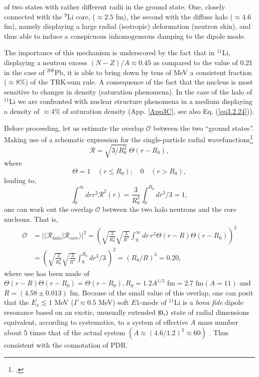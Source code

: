 of two states with rather different radii in the ground state. One, closely connected with the $^{9}$Li core, ($\approx 2.5$ fm), the second with the diffuse halo ($\approx 4.6$ fm), namely displaying a large radial (isotropic) deformation (neutron skin), and thus able to induce a conspicuous inhomogeneous damping to the dipole mode. 


The importance of this mechanism is underscored by the fact that in $^{11}$Li, displaying a neutron excess $(N-Z)/A\approx0.45$ as compared to the value of 0.21 in the case of $^{208}$Pb, it is able to bring down by tens of MeV a consistent fraction ($\approx 8$\%) of the TRK-sum rule. A consequence of the fact that the nucleus is most sensitive to changes in density (saturation phenomena). In the case of the halo of $^{11}$Li we are confronted with nuclear structure phenomena in a medium displaying a density of $\approx 4$\% of saturation density (App. \ref{App3C}, see also Eq. (\ref{eq3.2.24})). 

Before proceeding, let us estimate the overlap $\mathcal{O}$ between the two ``ground states''. Making use of a schematic expression for the single-particle radial wavefunctions\footnote{\cite{Bohr:69}.}
\begin{equation}
\mathcal{R}=\sqrt{3/R_0^3}\;\Theta(r-R_0),
\end{equation}
where 
\begin{equation*}
\Theta=1 \quad (r\leq R_0);\quad 0 \quad (r>R_0),
\end{equation*}
leading to,
\begin{equation}
\int_0^{\infty}dr r^2 \mathcal{R}^2(r)=\frac{3}{R_0^3}\int_0^{R_0}dr^3/3=1,
\end{equation}
one can work out the overlap $\mathcal{O}$ between the two halo neutrons and the core nucleons. That is, 
\begin{equation}\label{eq2.6.4}
\begin{split}
\mathcal{O}&=|\langle\mathcal{R}_{halo}|\mathcal{R}_{core}\rangle|^2=\left(\sqrt{\frac{3}{R_0^3}}\sqrt{\frac{3}{R^3}}\int_0^{\infty}dr\,r^2\Theta(r-R)\Theta(r-R_0)\right)^2\\
&=\left(\sqrt{\frac{3}{R_0^3}}\sqrt{\frac{3}{R^3}}\int_0^{R_0}dr^3/3\,\right)^2=(R_0/R)^3=0.20,
\end{split}
\end{equation}
where use has been made of $\Theta(r-R)\Theta(r-R_0)=\Theta(r-R_0), R_0=1.2A^{1/3} \text{ fm}=2.7 \text{ fm} (A=11)$ and $R=(4.58\pm 0.013)$ fm.
Because of the small value of this overlap, one can posit that the $E_x\lesssim1$ MeV ($\Gamma \approx 0.5$ MeV) soft $E1$-mode of $^{11}$Li is a \textit{bona fide} dipole  resonance based on an exotic, unusually extended $|{0_\nu} \rangle$ state of radial dimensions equivalent, according to systematics, to  a system of effective $A$ mass number about 5 times that of the actual system $(A\approx (4.6/1.2)^3\approx 60)$ .
 Thus consistent with the connotation of PDR.

